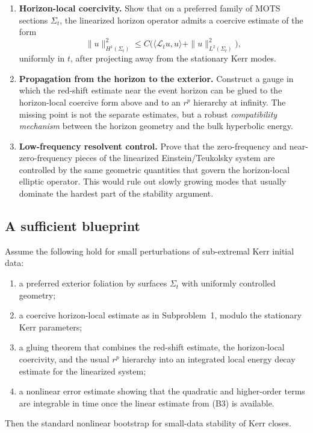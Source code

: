 \begin{enumerate}
    \item \textbf{Horizon-local coercivity.} Show that on a preferred family of MOTS sections $\Sigma_t$, the linearized horizon operator admits a coercive estimate of the form
    \[
        \|u\|_{H^1(\Sigma_t)}^2 \le C\Big(\langle \mathcal L_t u,u\rangle + \|u\|_{L^2(\Sigma_t)}^2\Big),
    \]
    uniformly in $t$, after projecting away from the stationary Kerr modes.

    \item \textbf{Propagation from the horizon to the exterior.} Construct a gauge in which the red-shift estimate near the event horizon can be glued to the horizon-local coercive form above and to an $r^p$ hierarchy at infinity. The missing point is not the separate estimates, but a robust \emph{compatibility mechanism} between the horizon geometry and the bulk hyperbolic energy.

    \item \textbf{Low-frequency resolvent control.} Prove that the zero-frequency and near-zero-frequency pieces of the linearized Einstein/Teukolsky system are controlled by the same geometric quantities that govern the horizon-local elliptic operator. This would rule out slowly growing modes that usually dominate the hardest part of the stability argument.
\end{enumerate}

\subsection{A sufficient blueprint}

\begin{proposition}\label{prop:ConditionalKerrBlueprint}
Assume the following hold for small perturbations of sub-extremal Kerr initial data:
\begin{enumerate}
    \item[(B1)] a preferred exterior foliation by surfaces $\Sigma_t$ with uniformly controlled geometry;
    \item[(B2)] a coercive horizon-local estimate as in Subproblem~1, modulo the stationary Kerr parameters;
    \item[(B3)] a gluing theorem that combines the red-shift estimate, the horizon-local coercivity, and the usual $r^p$ hierarchy into an integrated local energy decay estimate for the linearized system;
    \item[(B4)] a nonlinear error estimate showing that the quadratic and higher-order terms are integrable in time once the linear estimate from (B3) is available.
\end{enumerate}
Then the standard nonlinear bootstrap for small-data stability of Kerr closes.
\end{proposition}

